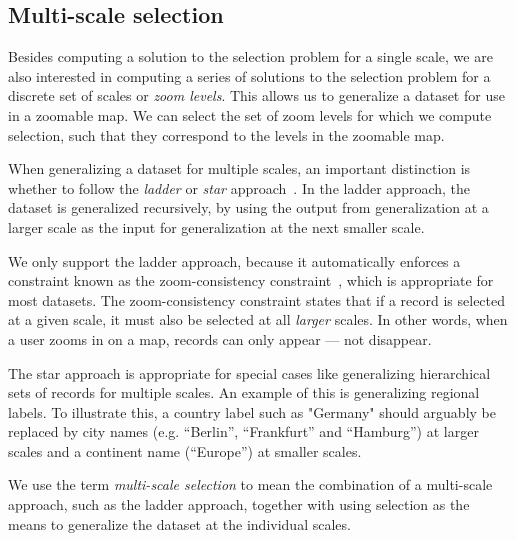 \subsection{Multi-scale selection}

Besides computing a solution to the selection problem for a single scale, we are also interested in computing a series of solutions to the selection problem for a discrete set of scales or \emph{zoom levels}. This allows us to generalize a dataset for use in a zoomable map. We can select the set of zoom levels for which we compute selection, such that they correspond to the levels in the zoomable map. 

When generalizing a dataset for multiple scales, an important distinction is whether to follow the \emph{ladder} or \emph{star} approach~\cite{foerster2010challenges}. In the ladder approach, the dataset is generalized recursively, by using the output from generalization at a larger scale as the input for generalization at the next smaller scale.

We only support the ladder approach, because it automatically enforces a constraint known as the zoom-consistency constraint~\cite{sarma2012fusiontables}, which is appropriate for most datasets. The zoom-consistency constraint states that if a record is selected at a given scale, it must also be selected at all \emph{larger} scales. In other words, when a user zooms in on a map, records can only appear --- not disappear.

The star approach is appropriate for special cases like generalizing hierarchical sets of records for multiple scales. An example of this is generalizing regional labels. To illustrate this, a country label such as "Germany" should arguably be replaced by city names (e.g. ``Berlin'', ``Frankfurt'' and ``Hamburg'') at larger scales and a continent name (``Europe'') at smaller scales.

We use the term \emph{multi-scale selection} to mean the combination of a multi-scale approach, such as the ladder approach, together with using selection as the means to generalize the dataset at the individual scales.
